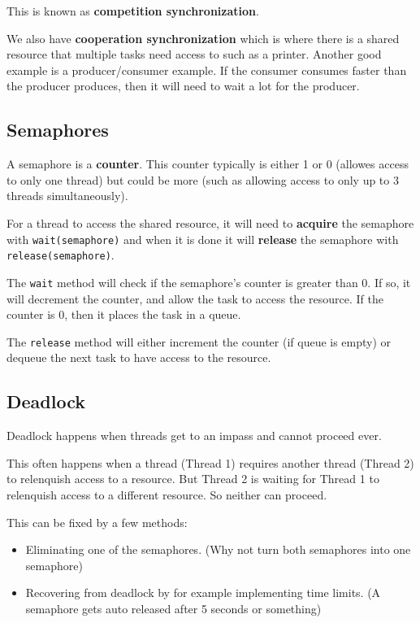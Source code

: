 \documentclass[12pt,letterpaper]{article} \usepackage{amsmath} \usepackage{graphicx} \usepackage[margin=1in]{geometry} \usepackage{longtable}  \usepackage{amssymb}
\begin{document}
	This is known as \textbf{competition synchronization}.
	
	We also have \textbf{cooperation synchronization} which is where there is a shared resource that multiple tasks need access to such as a printer. Another good example is a producer/consumer example. If the consumer consumes faster than the producer produces, then it will need to wait a lot for the producer. 
	
	\subsection{Semaphores}
	A semaphore is a \textbf{counter}. This counter typically is either 1 or 0 (allowes access to only one thread) but could be more (such as allowing access to only up to 3 threads simultaneously). 
	
	For a thread to access the shared resource, it will need to \textbf{acquire} the semaphore with \verb*|wait(semaphore)| and when it is done it will \textbf{release} the semaphore with \verb*|release(semaphore)|.
	
	The \verb|wait| method will check if the semaphore's counter is greater than 0. If so, it will decrement the counter, and allow the task to access the resource. If the counter is 0, then it places the task in a queue.
	
	The \verb*|release| method will either increment the counter (if queue is empty) or dequeue the next task to have access to the resource. 
	
	\subsection{Deadlock}
	Deadlock happens when threads get to an impass and cannot proceed ever. 
	
	This often happens when a thread (Thread 1) requires another thread (Thread 2) to relenquish access to a resource. But Thread 2 is waiting for Thread 1 to relenquish access to a different resource. So neither can proceed. 
	
	This can be fixed by a few methods:
	\begin{itemize}
		\item Eliminating one of the semaphores. (Why not turn both semaphores into one semaphore)
		\item Recovering from deadlock by for example implementing time limits. (A semaphore gets auto released after 5 seconds or something)
	\end{itemize}
	
\end{document}
